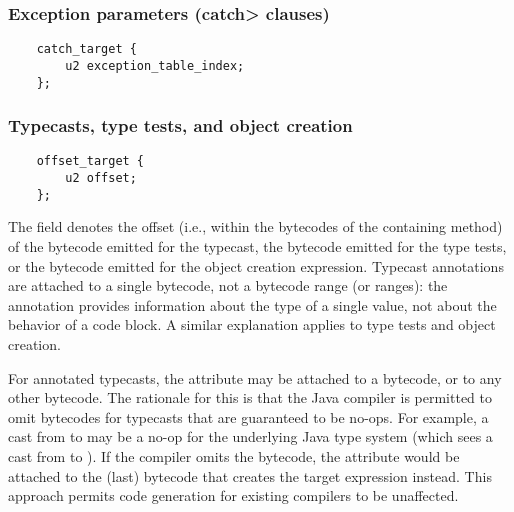 \documentclass[10pt]{article}
\begin{document}
\subsubsection{Exception parameters (\<catch> clauses)\label{class-file:ext:ri:catch}}


\preverbnegspace
\begin{Verbatim}
    catch_target {
        u2 exception_table_index;
    };
\end{Verbatim}



\subsubsection{Typecasts, type tests, and object creation\label{class-file:ext:ri:typecast}}


\preverbnegspace
\begin{Verbatim}
    offset_target {
        u2 offset;
    };
\end{Verbatim}

The  field denotes the offset (i.e., within the bytecodes
of the containing method) of the  bytecode emitted for
the typecast, the  bytecode emitted for the type tests,
or the  bytecode emitted for the object creation expression.
Typecast annotations are attached to a single bytecode, not a bytecode range
(or ranges):  the annotation provides information about the type of a
single value, not about the behavior of a code block.
A similar explanation applies to type tests and object creation.

For annotated typecasts, the attribute may be attached to a
 bytecode, or to any other bytecode.  The rationale for
this is that the Java compiler is permitted to omit 
bytecodes for typecasts that are guaranteed to be no-ops.  For example, a
cast from  to  may be a no-op for the
underlying Java type system (which sees a cast from  to
).  If the compiler omits the  bytecode, the
 attribute would be attached to the (last) bytecode that
creates the target expression instead.  This approach permits code
generation for existing compilers to be unaffected.
\end{document}
